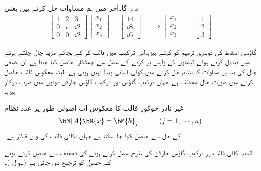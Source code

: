دے گا۔آخر میں ہم مساوات  حل کرتے ہیں یعنی:
\begin{align*}
\begin{bmatrix}
1&2&3\\
0&i&i2\\
0&0&i2
\end{bmatrix}
\begin{bmatrix}
x_1\\
x_2\\
x_3
\end{bmatrix}=
\begin{bmatrix}
14\\
i8\\
i6
\end{bmatrix}\quad\implies
\begin{bmatrix}
x_1\\
x_2\\
x_3
\end{bmatrix}=
\begin{bmatrix}
1\\
2\\
3
\end{bmatrix}
\end{align*}


گاؤسی اسقاط کی دوسری ترمیم کو  کہتے ہیں۔اس ترکیب میں قالب کو  کے بجائے مزید چال چلتے ہوئے   میں تبدیل کرتے ہوئے قیمتوں کے واپس پر کرنے کے عمل سے چھٹکارا حاصل کیا جاتا ہے۔ان اضافی چال کی بنا  پر مساوات کا نظام حل کرنے میں کوئی آسانی پیدا نہیں ہوتی ہے۔البتہ معکوس قالب حاصل کرنے میں صورت حال مختلف ہے جہاں ترکیب گاؤس اور ترکیب گاؤس جارڈن دونوں میں  ضرب درکار ہیں۔

غیر نادر چوکور قالب  کا معکوس اب اصولی طور پر  عدد نظام
\begin{align}\label{مساوات_خطی_اعدادی_شولسکی_ٹ}
\bM{A}\bM{x}=\bM{b}_j\quad \quad \quad (j=1,\cdots,n)
\end{align}
کے حل سے حاصل کیا جا سکتا ہے جہاں  اکائی قالب کی  ویں قطار  ہے۔

البتہ اکائی قالب  پر ترکیب گاؤس جارڈن کی طرح عمل کرتے ہوئے  کی تخفیف سے   حاصل کرتے ہوئے  کے حصول کو ترجیح دی جاتی ہے (سوال )۔

